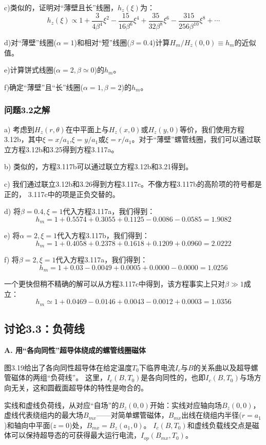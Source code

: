 c)类似的，证明对“薄壁且长”线圈，$h_z(\xi)$为：
\begin{equation*}
h_z(\xi)\propto1+\frac{3}{4\beta^4}\xi^2-\frac{15}{16\beta^6}\xi^4+\frac{35}{32\beta^8}\xi^6-\frac{315}{256\beta^{10}}\xi^8+\cdots\tag{3.117c}%
\end{equation*}

d)对“薄壁”线圈($\alpha=1$)和相对“短”线圈($\beta=0.4$)计算$H_m/H_z(0, 0)\equiv h_m$的近似值。

e)计算饼式线圈($\alpha=2,\beta\simeq 0$)的$h_m$。

f)确定“薄壁”且“长”线圈($\alpha=1,\beta=2$)的$h_m$。 

\subsubsection{问题3.2之解}
a) 考虑到$H_z(r,\theta)$在中平面上与$H_z(x, 0)$或$H_z(y, 0)$等价，我们使用方程3.12b，其中$\xi = x/a_1$,$\xi = y/a_1$或$\xi = r/a_1$。对于“薄壁”螺管线圈，我们可以通过联立方程3.12b和3.25得到方程3.117a。

b) 类似的，方程3.117b可以通过联立方程3.12b和3.21得到。

c) 我们通过联立3.12b和3.26得到方程3.117c。不像方程3.117b的高阶项的符号都是正的，
3.117c中的项是正负交替的。 

d) 将$\beta=0.4,\xi=1$代入方程3.117a，我们得到：
$$h_m=1 + 0.5574 + 0.3055 + 0.1125 − 0.0086 − 0.0585 = 1.9082$$

e) 将$\alpha=2,\xi=1$代入方程3.117b，我们得到：
$$ h_m=1 + 0.4058 + 0.2378 + 0.1618 + 0.1209 + 0.0960 = 2.0222$$

f) 将$\beta=2,\xi=1$代入方程3.117a，我们得到：
$$ h_m=1 + 0.03 − 0.0049 + 0.0005 + 0.0000 − 0.0000 = 1.0256 $$

一个更快但稍不精确的解可以从方程3.117c中得到，该方程事实上只对$\beta\gg 1$成立：
$$h_m \simeq 1 + 0.0469 − 0.0146 + 0.0043 − 0.0012 + 0.0003 = 1.0356$$



\subsection{讨论3.3：负荷线}
\textbf{A. 用“各向同性”超导体绕成的螺管线圈磁体}

图3.19给出了各向同性超导体在给定温度$T_0$下临界电流$I_c$与$B$的关系曲以及超导螺管磁体的两组“负荷线”。
这里，$I_c(B,T_0)$是各向同性的，也即$I_c(B,T_0)$与场方向无关，这和圆截面超导体的特性是吻合的。

实线和虚线负荷线，从对应“自场”的$B_z(0,0)$开始：实线对应轴向场$B_z(0,0)$，虚线代表绕组内的最大场$B_{mx}$——对简单螺管磁体，$B_{mx}$出线在绕组内半径($r=a_1$)和轴向中平面($z=0$)处，$B_{mx}=B_z(a_1,0)$。
$I_c(B,T_0)$和虚线负载线交点是磁体可以保持超导态的可获得最大运行电流，$I_{op}(B_{mx},T_0)$。

